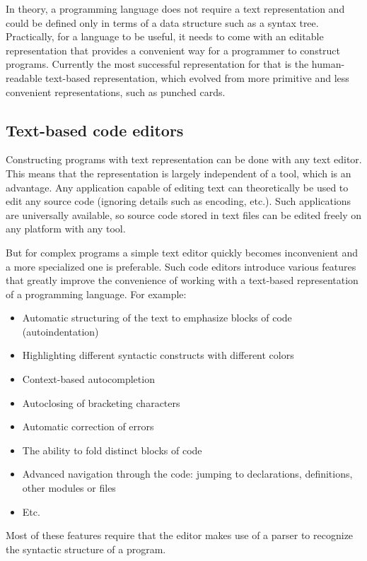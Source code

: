 In theory, a programming language does not require a text representation and
could be defined only in terms of a data structure such as a syntax
tree. Practically, for a language to be useful, it needs to come with an
editable representation that provides a convenient way for a programmer to
construct programs. Currently the most successful representation for that is the
human-readable text-based representation, which evolved from more primitive and
less convenient representations, such as punched cards\cite{columbia_history_cards, punched_cards_wikipedia}.

\subsection{Text-based code editors}
Constructing programs with text representation can be done with any text editor. This means that the representation is largely independent of a tool, which is an advantage. Any application capable of editing text can theoretically be used to edit any source code (ignoring details such as encoding, etc.). Such applications are universally available, so source code stored in text files can be edited freely on any platform with any tool.

But for complex programs a simple text editor quickly becomes inconvenient and a
more specialized one is preferable. Such code editors introduce various features
that greatly improve the convenience of working with a text-based representation
of a programming language. For example:
\begin{itemize}
	\item Automatic structuring of the text to emphasize blocks of code
          (autoindentation)
	\item Highlighting different syntactic constructs with different colors
	\item Context-based autocompletion
	\item Autoclosing of bracketing characters
	\item Automatic correction of errors
	\item The ability to fold distinct blocks of code
	\item Advanced navigation through the code: jumping to declarations,
          definitions, other modules or files
	\item Etc.
\end{itemize}

Most of these features require that the editor makes use of a parser to
recognize the syntactic structure of a program.

